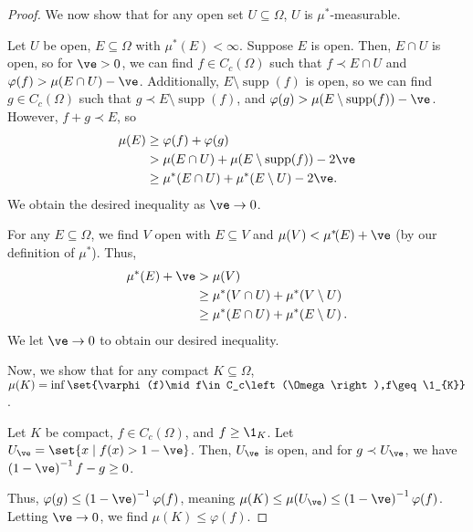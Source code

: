 \documentclass[10pt]{mypackage}
\DeclareMathOperator{\supp}{supp}
\begin{document}
\begin{proof}
  We now show that for any open set $U\subseteq \Omega$, $U$ is $\mu^{\ast}$-measurable.\newline

  Let $U$ be open, $E\subseteq \Omega$ with $\mu^{\ast}\!\left(E\right) < \infty$. Suppose $E$ is open. Then, $E\cap U$ is open, so for $\ve > 0$, we can find $f\in C_c\left(\Omega\right)$ such that $f\prec E\cap U$ and $\varphi(f) > \mu\!\left(E\cap U\right) - \ve$. Additionally, $E\setminus \supp\left(f\right)$ is open, so we can find $g\in C_c\left(\Omega\right)$ such that $g\prec E\setminus \supp(f)$, and $\varphi(g) > \mu\!\left(E\setminus \supp(f)\right) - \ve$. However, $f + g\prec E$, so
  \begin{align*}
    \mu(E) &\geq \varphi(f) + \varphi(g)\\
           &> \mu\!\left(E\cap U\right) + \mu\!\left(E\setminus \supp(f)\right) - 2\ve\\
           &\geq \mu^{\ast}\!\left(E\cap U\right) + \mu^{\ast}\!\left(E\setminus U\right) - 2\ve.
  \end{align*}
  We obtain the desired inequality as $\ve\rightarrow 0$.\newline

  For any $E\subseteq \Omega$, we find $V$ open with $E\subseteq V$ and $\mu(V) < \mu^{\ast}\!(E) + \ve$ (by our definition of $\mu^{\ast}$). Thus,
  \begin{align*}
    \mu^{\ast}\!\left(E\right) + \ve &> \mu\!\left(V\right)\\
                                     &\geq \mu^{\ast}\!\left(V\cap U\right) + \mu^{\ast}\!\left(V\setminus U\right)\\
                                     &\geq \mu^{\ast}\!\left(E\cap U\right) + \mu^{\ast}\!\left(E\setminus U\right).
  \end{align*}
  We let $\ve \rightarrow 0$ to obtain our desired inequality.\newline

  Now, we show that for any compact $K\subseteq \Omega$, $\mu\!\left(K\right) = \inf\set{\varphi(f)\mid f\in C_c\left(\Omega\right),f\geq \1_{K}}$.\newline

  Let $K$ be compact, $f\in C_c\left(\Omega\right)$, and $f\geq \1_K$. Let $U_{\ve} = \set{x\mid f(x) > 1-\ve}$. Then, $U_{\ve}$ is open, and for $g\prec U_{\ve}$, we have $\left(1-\ve\right)^{-1}f - g \geq 0$.\newline

  Thus, $\varphi(g) \leq \left(1-\ve\right)^{-1}\varphi(f)$, meaning $\mu\!\left(K\right) \leq \mu\!\left(U_{\ve}\right) \leq \left(1-\ve\right)^{-1}\varphi(f)$. Letting $\ve \rightarrow 0$, we find $\mu\!\left(K\right) \leq \varphi(f)$.\newline


\end{proof}
\end{document}
